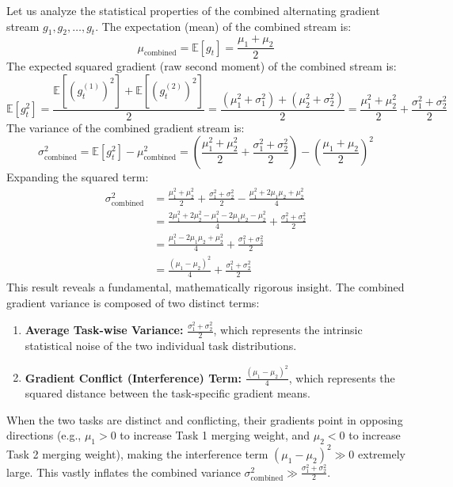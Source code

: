 \documentclass{article}
\theoremstyle{plain}
\theoremstyle{definition}
\theoremstyle{remark}
\begin{document}
Let us analyze the statistical properties of the combined alternating gradient stream $g_1, g_2, \dots, g_t$.
The expectation (mean) of the combined stream is:
\begin{equation}
    \mu_{\text{combined}} = \mathbb{E}[g_t] = \frac{\mu_1 + \mu_2}{2}
\end{equation}
The expected squared gradient (raw second moment) of the combined stream is:
\begin{equation}
    \mathbb{E}[g_t^2] = \frac{\mathbb{E}[(g_t^{(1)})^2] + \mathbb{E}[(g_t^{(2)})^2]}{2} = \frac{(\mu_1^2 + \sigma_1^2) + (\mu_2^2 + \sigma_2^2)}{2} = \frac{\mu_1^2 + \mu_2^2}{2} + \frac{\sigma_1^2 + \sigma_2^2}{2}
\end{equation}
The variance of the combined gradient stream is:
\begin{equation}
    \sigma_{\text{combined}}^2 = \mathbb{E}[g_t^2] - \mu_{\text{combined}}^2 = \left( \frac{\mu_1^2 + \mu_2^2}{2} + \frac{\sigma_1^2 + \sigma_2^2}{2} \right) - \left( \frac{\mu_1 + \mu_2}{2} \right)^2
\end{equation}
Expanding the squared term:
\begin{align}
    \sigma_{\text{combined}}^2 &= \frac{\mu_1^2 + \mu_2^2}{2} + \frac{\sigma_1^2 + \sigma_2^2}{2} - \frac{\mu_1^2 + 2\mu_1\mu_2 + \mu_2^2}{4} \nonumber\\
    &= \frac{2\mu_1^2 + 2\mu_2^2 - \mu_1^2 - 2\mu_1\mu_2 - \mu_2^2}{4} + \frac{\sigma_1^2 + \sigma_2^2}{2} \nonumber\\
    &= \frac{\mu_1^2 - 2\mu_1\mu_2 + \mu_2^2}{4} + \frac{\sigma_1^2 + \sigma_2^2}{2} \nonumber\\
    &= \frac{(\mu_1 - \mu_2)^2}{4} + \frac{\sigma_1^2 + \sigma_2^2}{2}
\end{align}
This result reveals a fundamental, mathematically rigorous insight. The combined gradient variance is composed of two distinct terms:
\begin{enumerate}
    \item \textbf{Average Task-wise Variance:} $\frac{\sigma_1^2 + \sigma_2^2}{2}$, which represents the intrinsic statistical noise of the two individual task distributions.
    \item \textbf{Gradient Conflict (Interference) Term:} $\frac{(\mu_1 - \mu_2)^2}{4}$, which represents the squared distance between the task-specific gradient means.
\end{enumerate}

When the two tasks are distinct and conflicting, their gradients point in opposing directions (e.g., $\mu_1 > 0$ to increase Task 1 merging weight, and $\mu_2 < 0$ to increase Task 2 merging weight), making the interference term $(\mu_1 - \mu_2)^2 \gg 0$ extremely large. This vastly inflates the combined variance $\sigma_{\text{combined}}^2 \gg \frac{\sigma_1^2 + \sigma_2^2}{2}$.
\end{document}
